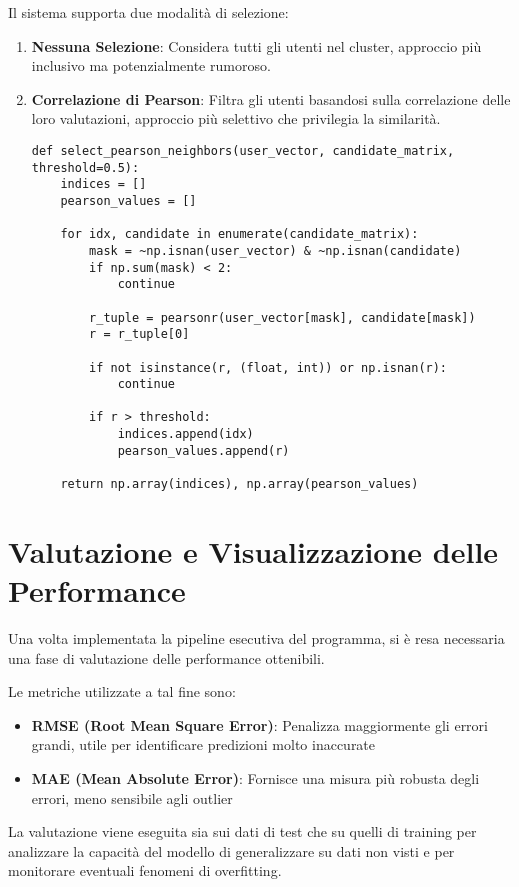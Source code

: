 Il sistema supporta due modalità di selezione:
\begin{enumerate}
    \item \textbf{Nessuna Selezione}: Considera tutti gli utenti nel cluster, approccio più inclusivo ma potenzialmente rumoroso.
    \item \textbf{Correlazione di Pearson}: Filtra gli utenti basandosi sulla correlazione delle loro valutazioni, approccio più selettivo che privilegia la similarità.
\begin{lstlisting}[style=PythonStyle, caption=Selezione vicini Pearson]
def select_pearson_neighbors(user_vector, candidate_matrix, threshold=0.5):
    indices = []
    pearson_values = []
    
    for idx, candidate in enumerate(candidate_matrix):
        mask = ~np.isnan(user_vector) & ~np.isnan(candidate)
        if np.sum(mask) < 2:
            continue
        
        r_tuple = pearsonr(user_vector[mask], candidate[mask])
        r = r_tuple[0]
        
        if not isinstance(r, (float, int)) or np.isnan(r):
            continue
        
        if r > threshold:
            indices.append(idx)
            pearson_values.append(r)
    
    return np.array(indices), np.array(pearson_values)
\end{lstlisting}
\end{enumerate}


\section{Valutazione e Visualizzazione delle Performance}

Una volta implementata la pipeline esecutiva del programma, si è resa necessaria una fase di valutazione delle performance ottenibili.

Le metriche utilizzate a tal fine sono:
\begin{itemize}
    \item \textbf{RMSE (Root Mean Square Error)}: Penalizza maggiormente gli errori grandi, utile per identificare predizioni molto inaccurate
    \item \textbf{MAE (Mean Absolute Error)}: Fornisce una misura più robusta degli errori, meno sensibile agli outlier
\end{itemize}

La valutazione viene eseguita sia sui dati di test che su quelli di training per analizzare la capacità del modello di generalizzare su dati non visti e per monitorare eventuali fenomeni di overfitting.

